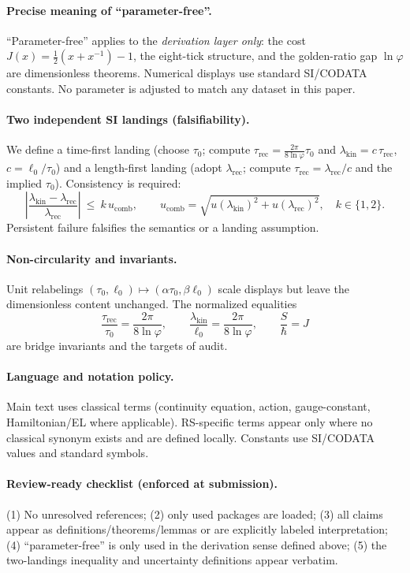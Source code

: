 \documentclass[11pt]{article}
\theoremstyle{plain}
\theoremstyle{definition}
\theoremstyle{remark}
\begin{document}
\paragraph{Precise meaning of “parameter-free”.}
“Parameter-free” applies to the \emph{derivation layer only}: the cost \(J(x)=\tfrac12(x+x^{-1})-1\), the eight-tick structure, and the golden-ratio gap \(\ln\varphi\) are dimensionless theorems. Numerical displays use standard SI/CODATA constants. No parameter is adjusted to match any dataset in this paper.

\paragraph{Two independent SI landings (falsifiability).}
We define a time-first landing (choose \(\tau_0\); compute \(\tau_{\mathrm{rec}}=\frac{2\pi}{8\ln\varphi}\tau_0\) and \(\lambda_{\mathrm{kin}}=c\,\tau_{\mathrm{rec}}\), \(c=\ell_0/\tau_0\)) and a length-first landing (adopt \(\lambda_{\mathrm{rec}}\); compute \(\tau_{\mathrm{rec}}=\lambda_{\mathrm{rec}}/c\) and the implied \(\tau_0\)). Consistency is required:
\[
\left|\frac{\lambda_{\mathrm{kin}}-\lambda_{\mathrm{rec}}}{\lambda_{\mathrm{rec}}}\right|\ \le\ k\,u_{\mathrm{comb}},\qquad
u_{\mathrm{comb}}=\sqrt{u(\lambda_{\mathrm{kin}})^2+u(\lambda_{\mathrm{rec}})^2},\quad k\in\{1,2\}.
\]
Persistent failure falsifies the semantics or a landing assumption.

\paragraph{Non-circularity and invariants.}
Unit relabelings \((\tau_0,\ell_0)\mapsto(\alpha\tau_0,\beta\ell_0)\) scale displays but leave the dimensionless content unchanged. The normalized equalities
\[
\frac{\tau_{\mathrm{rec}}}{\tau_0}=\frac{2\pi}{8\ln\varphi},\qquad
\frac{\lambda_{\mathrm{kin}}}{\ell_0}=\frac{2\pi}{8\ln\varphi},\qquad
\frac{S}{\hbar}=J
\]
are bridge invariants and the targets of audit.

\paragraph{Language and notation policy.}
Main text uses classical terms (continuity equation, action, gauge-constant, Hamiltonian/EL where applicable). RS-specific terms appear only where no classical synonym exists and are defined locally. Constants use SI/CODATA values and standard symbols.

\paragraph{Review-ready checklist (enforced at submission).}
(1) No unresolved references; (2) only used packages are loaded; (3) all claims appear as definitions/theorems/lemmas or are explicitly labeled interpretation; (4) “parameter-free” is only used in the derivation sense defined above; (5) the two-landings inequality and uncertainty definitions appear verbatim.
\end{document}
